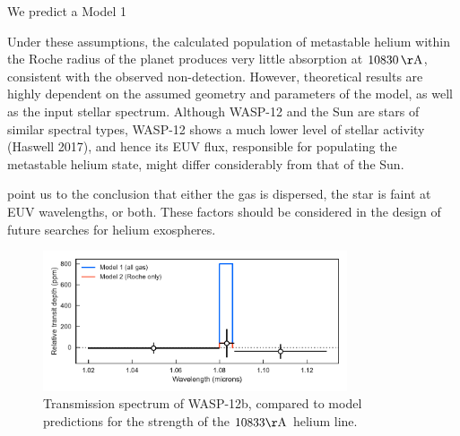 \documentclass[RNAAS]{aastex62}
\begin{document}
We predict a Model 1 


Under these assumptions, the calculated population of metastable helium within
the Roche radius of the planet produces very little absorption at
$10830\,\mathrm{\AA}$, consistent with the observed non-detection. However, theoretical results are highly dependent on the assumed geometry and parameters of the model, as well as the input stellar spectrum. Although WASP-12 and the Sun are stars of similar spectral types, WASP-12 shows a much lower level of stellar activity (Haswell 2017), and hence its EUV flux, responsible for populating the metastable helium state, might differ considerably from that of the Sun. 

point us to the conclusion that either the gas is dispersed, the star 
is faint at EUV wavelengths, or both. These factors should be
considered in the design of future searches for helium exospheres.

\begin{figure}[b!]
\includegraphics[width = 0.8\textwidth]{Figures/fig1.pdf}
\caption{Transmission spectrum of WASP-12b, compared to model predictions for the strength of the $10833\mathrm{\AA}$ helium line.}
\label{fig:spectrum}
\end{figure}




\end{document}
